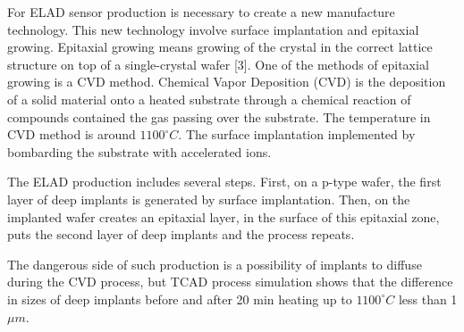 For ELAD sensor production is necessary to create a new manufacture technology. This new technology involve surface implantation and epitaxial growing. Epitaxial growing means growing of the crystal in the correct lattice structure on top of a single-crystal wafer [3]. One of the methods of epitaxial growing is a CVD method. Chemical Vapor Deposition (CVD) is the deposition of a solid material onto a heated substrate through a chemical reaction of compounds contained the gas passing over the substrate. The temperature in CVD method is around $1100^\circ C$. The surface implantation implemented by bombarding the substrate with accelerated ions.

The ELAD production includes several steps. First, on a p-type wafer, the first layer of deep implants is generated by surface implantation. Then, on the implanted wafer creates an epitaxial layer, in the surface of this epitaxial zone, puts the second layer of deep implants and the process repeats. 

The dangerous side of such production is a possibility of implants to diffuse during the CVD process, but TCAD process simulation shows that the difference in sizes of deep implants before and after 20 min heating up to $1100^\circ C$ less than 1 $\mu m$.